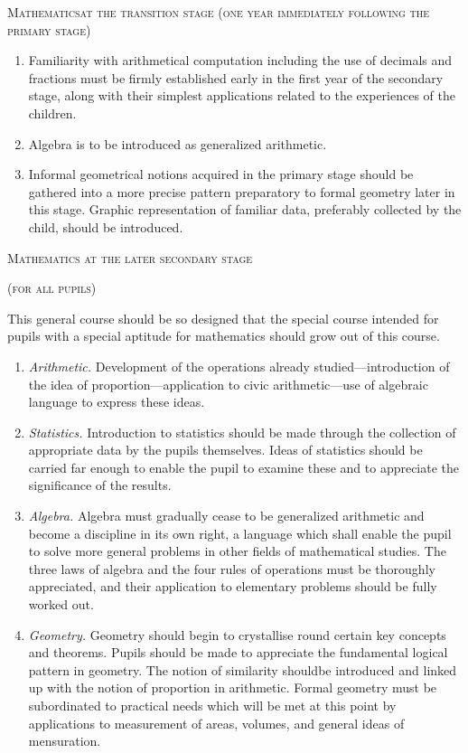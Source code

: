 \medskip
\begin{center}
\textsc{Mathematics\pageoriginale at the transition stage (one year immediately following the primary stage)}
\end{center}
\medskip
\begin{enumerate}
\item Familiarity with arithmetical computation including the use of decimals and fractions must be firmly established early in the first year of the secondary stage, along with their simplest applications related to the experiences of the children.

\item Algebra is to be introduced as generalized arithmetic.

\item Informal geometrical notions acquired in the primary stage should be gathered into a more precise pattern preparatory to formal geometry later in this stage. Graphic representation of familiar data, preferably collected by the child, should be introduced.
\end{enumerate}

\begin{center}
{\textsc{Mathematics at the later secondary stage}}
\medskip

{\textsc{(for all pupils)}}
\end{center}

This general course should be so designed that the special course intended for pupils with a special aptitude for mathematics should grow out of this course.
\begin{enumerate}
\item {\em Arithmetic.} Development of the operations already studied---intro\-duction of the idea of proportion---application to civic arithmetic\----use of algebraic language to express these ideas.

\item {\em Statistics.} Introduction to statistics should be made through the collection of appropriate data by the pupils themselves. Ideas of statistics should be carried far enough to enable the pupil to examine these and to appreciate the significance of the results.

\item {\em Algebra.} Algebra must gradually cease to be generalized arithmetic and become a discipline in its own right, a language which shall enable the pupil to solve more general problems in other fields of mathematical studies. The three laws of algebra and the four rules of operations must be thoroughly appreciated, and their application to elementary problems should be fully worked out.

\item {\em Geometry.} Geometry should begin to crystallise round certain key concepts and theorems. Pupils should be made to appreciate the fundamental logical pattern in geometry. The notion of similarity should\pageoriginale be introduced and linked up with the notion of proportion in arithmetic. Formal geometry must be subordinated to practical needs which will be met at this point by applications to measurement of areas, volumes, and general ideas of mensuration.
\end{enumerate}


